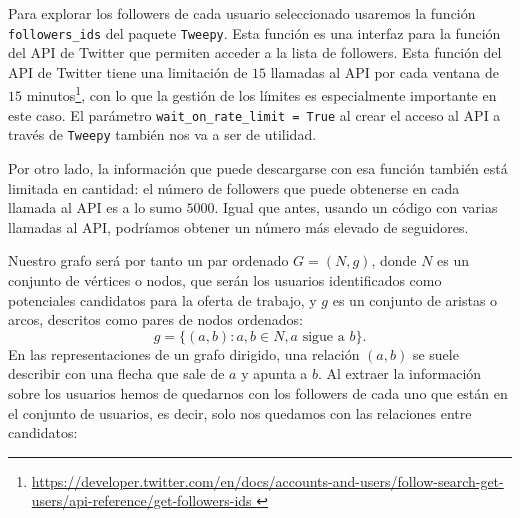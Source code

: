 Para explorar los followers de cada usuario seleccionado usaremos la función 
{\tt followers\_ids} del paquete {\tt Tweepy}. Esta función es una interfaz
para la función del API de Twitter que permiten acceder a la lista de 
followers. Esta función del API de Twitter
tiene una limitación de $15$ llamadas al API por cada ventana de $15$ 
minutos\footnote{\url{https://developer.twitter.com/en/docs/accounts-and-users/follow-search-get-users/api-reference/get-followers-ids }},
con lo que la gestión de los límites es especialmente importante en este caso.
El parámetro {\tt wait\_on\_rate\_limit = True} al crear el acceso al API a 
través de {\tt Tweepy} también nos va a ser de utilidad.

Por otro lado, la información que puede descargarse con esa función también
está limitada en cantidad: el número de followers que puede obtenerse en cada llamada 
al API es a lo sumo $5000$. Igual que antes,
usando un código con varias llamadas al API, podríamos obtener un número más elevado de 
seguidores.

Nuestro grafo será por tanto un par ordenado 
$G=(N,g)$, donde $N$ es un conjunto de vértices o nodos, que serán los usuarios
identificados como potenciales candidatos para la oferta de trabajo, y $g$
es un conjunto de aristas o arcos, descritos como pares de nodos ordenados:
$$g=\{(a,b): a,b\in N, a \mbox{ sigue a }b\}.$$
En las representaciones de un grafo dirigido, una relación $(a,b)$ se 
suele describir con una flecha que sale de $a$ y apunta a $b$.
Al extraer la información sobre los usuarios hemos de quedarnos con los followers
de cada uno que están en el conjunto de usuarios, es decir, solo nos quedamos con
las relaciones entre candidatos:


